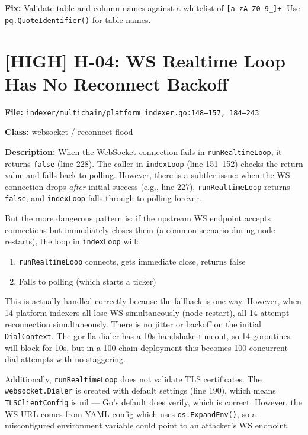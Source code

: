 \documentclass{article}
\begin{document}
\textbf{Fix:} Validate table and column names against a whitelist of
\texttt{[a-zA-Z0-9\_]+}. Use \texttt{pq.QuoteIdentifier()} for table names.


\section{[HIGH] H-04: WS Realtime Loop Has No Reconnect Backoff}

\textbf{File:} \texttt{indexer/multichain/platform\_indexer.go:148--157, 184--243}

\textbf{Class:} websocket / reconnect-flood

\textbf{Description:}
When the WebSocket connection fails in \texttt{runRealtimeLoop}, it returns
\texttt{false} (line 228). The caller in \texttt{indexLoop} (line 151--152)
checks the return value and falls back to polling. However, there is a
subtler issue: when the WS connection drops \emph{after} initial success
(e.g., line 227), \texttt{runRealtimeLoop} returns \texttt{false}, and
\texttt{indexLoop} falls through to polling forever.

But the more dangerous pattern is: if the upstream WS endpoint accepts
connections but immediately closes them (a common scenario during node
restarts), the loop in \texttt{indexLoop} will:
\begin{enumerate}
  \item \texttt{runRealtimeLoop} connects, gets immediate close, returns false
  \item Falls to polling (which starts a ticker)
\end{enumerate}

This is actually handled correctly because the fallback is one-way. However,
when 14 platform indexers all lose WS simultaneously (node restart), all 14
attempt reconnection simultaneously. There is no jitter or backoff on the
initial \texttt{DialContext}. The gorilla dialer has a 10s handshake timeout,
so 14 goroutines will block for 10s, but in a 100-chain deployment this
becomes 100 concurrent dial attempts with no staggering.

Additionally, \texttt{runRealtimeLoop} does not validate TLS certificates.
The \texttt{websocket.Dialer} is created with default settings (line 190),
which means \texttt{TLSClientConfig} is nil --- Go's default does verify,
which is correct. However, the WS URL comes from YAML config which uses
\texttt{os.ExpandEnv()}, so a misconfigured environment variable could
point to an attacker's WS endpoint.
\end{document}

